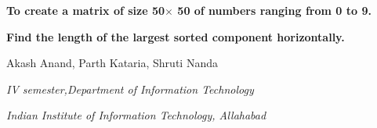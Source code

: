 \documentclass[12pt]{report}
\renewcommand{\_}{\kern-1.5pt\textunderscore\kern-1.5pt}
\begin{document}
\begin{Center}
{\fontsize{14pt}{16.8pt}\selectfont \textbf{To create a matrix of size 50$ \times $ 50 of numbers ranging from 0 to 9.}\par}
\end{Center}\par

\begin{Center}
{\fontsize{14pt}{16.8pt}\selectfont \textbf{Find the length of the largest sorted component horizontally.}\par}
\end{Center}\par

\begin{Center}
Akash Anand, Parth Kataria, Shruti Nanda
\end{Center}\par

\par

\begin{Center}
\textit{IV semester,Department of Information Technology}
\end{Center}\par

\begin{Center}
\textit{Indian Institute of Information Technology, Allahabad}
\end{Center}\par
\end{document}
